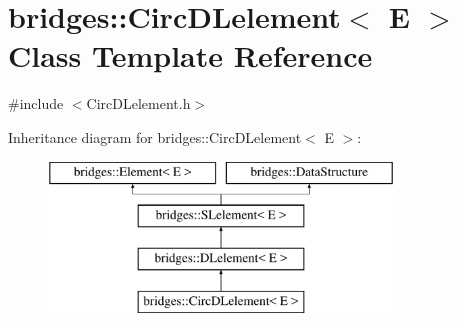 \hypertarget{classbridges_1_1_circ_d_lelement}{}\section{bridges\+:\+:Circ\+D\+Lelement$<$ E $>$ Class Template Reference}
\label{classbridges_1_1_circ_d_lelement}


{\ttfamily \#include $<$Circ\+D\+Lelement.\+h$>$}

Inheritance diagram for bridges\+:\+:Circ\+D\+Lelement$<$ E $>$\+:\begin{figure}[H]
\begin{center}
\leavevmode
\includegraphics[height=4.000000cm]{classbridges_1_1_circ_d_lelement}
\end{center}
\end{figure}
